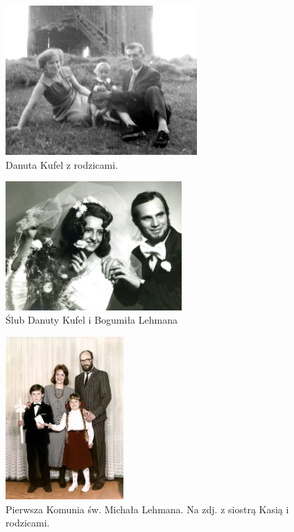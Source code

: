 \begin{figure}[!h]
\begin{center}
\includegraphics[width=0.65\textwidth]{photo/danuta_kufel.jpg}
\caption{Danuta Kufel z rodzicami.}
\end{center}
\end{figure}

\begin{figure}[!h]
\begin{center}
\includegraphics[width=0.6\textwidth]{photo/bogumil_danuta_lehman_slub.jpg}
\caption{Ślub Danuty Kufel i Bogumiła Lehmana}
\end{center}
\end{figure}

\begin{figure}[!h]
\begin{center}
\includegraphics[width=0.4\textwidth]{photo/michal_lehman_komunia.jpg}
\caption[Pierwsza Komunia św. Michała Lehmana]{Pierwsza Komunia św. Michała Lehmana. Na zdj. z  siostrą Kasią i rodzicami.}
\end{center}
\end{figure}

